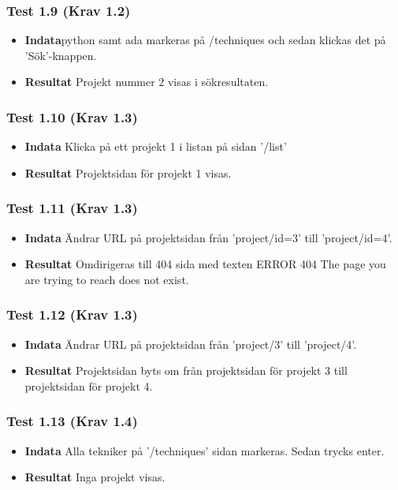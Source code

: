 \documentclass{TDP003mall}
\begin{document}
\subsubsection*{Test 1.9 (Krav 1.2)}
\begin{itemize}
\item[]\textbf{Indata}python samt ada markeras på /techniques och sedan klickas det på 'Sök'-knappen.
\item[]\textbf{Resultat} Projekt nummer 2 visas i sökresultaten.
\end{itemize}
\subsubsection*{Test 1.10 (Krav 1.3)}
\begin{itemize}
\item[]\textbf{Indata} Klicka på ett projekt 1 i listan på sidan '/list'
\item[]\textbf{Resultat} Projektsidan för projekt 1 visas.
\end{itemize}
\subsubsection*{Test 1.11 (Krav 1.3)}
\begin{itemize}
\item[]\textbf{Indata} Ändrar URL på projektsidan från 'project/id=3' till 'project/id=4'.
\item[]\textbf{Resultat} Omdirigeras till 404 sida med texten ERROR 404 The page you are trying to reach does not exist.
\end{itemize}
\subsubsection*{Test 1.12 (Krav 1.3)}
\begin{itemize}
\item[]\textbf{Indata} Ändrar URL på projektsidan från 'project/3' till 'project/4'.
\item[]\textbf{Resultat} Projektsidan byts om från projektsidan för projekt 3 till projektsidan för projekt 4.
\end{itemize}
\subsubsection*{Test 1.13 (Krav 1.4)}
\begin{itemize}
\item[]\textbf{Indata} Alla tekniker på '/techniques' sidan markeras. Sedan trycks enter.
\item[]\textbf{Resultat} Inga projekt visas.
\end{itemize}
\end{document}
